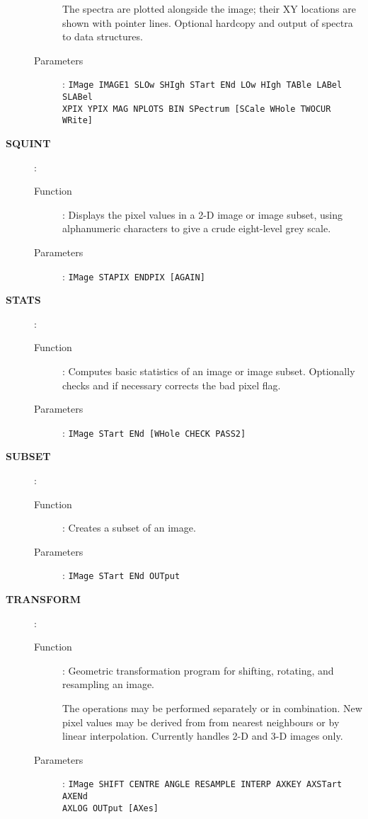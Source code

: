 \begin{description}
\begin{description}
      The spectra are plotted alongside the image; their XY locations
      are shown with pointer lines. Optional hardcopy and output of
      spectra to data structures.
   \item[Parameters]:
      {\tt IMage IMAGE1 SLOw SHIgh STart ENd LOw HIgh TABle LABel SLABel\\
      XPIX YPIX MAG NPLOTS BIN SPectrum [SCale WHole TWOCUR WRite]}
   \end{description}

\newpage

\item[\large\bf SQUINT]:
   \begin{description}
   \item[Function]:
      Displays the pixel values in a 2-D image or image subset, using
      alphanumeric characters to give a crude eight-level grey scale.
   \item[Parameters]:
      {\tt IMage STAPIX ENDPIX [AGAIN]}
   \end{description}

\item[\large\bf STATS]:
   \begin{description}
   \item[Function]:
      Computes basic statistics of an image or image subset. Optionally
      checks and if necessary corrects the bad pixel flag.
   \item[Parameters]:
      {\tt IMage STart ENd [WHole CHECK PASS2]}
   \end{description}

\item[\large\bf SUBSET]:
   \begin{description}
   \item[Function]:
      Creates a subset of an image.
   \item[Parameters]:
      {\tt IMage STart ENd OUTput}
   \end{description}

\item[\large\bf TRANSFORM]:
   \begin{description}
   \item[Function]:
      Geometric transformation program for shifting, rotating, and
      resampling an image.

      The operations may be performed separately or in combination. New
      pixel values may be derived from from nearest neighbours or by
      linear interpolation. Currently handles 2-D and 3-D images only.
   \item[Parameters]:
      {\tt IMage SHIFT CENTRE ANGLE RESAMPLE INTERP AXKEY AXSTart AXENd\\
      AXLOG OUTput [AXes]}
   \end{description}


\end{description}
